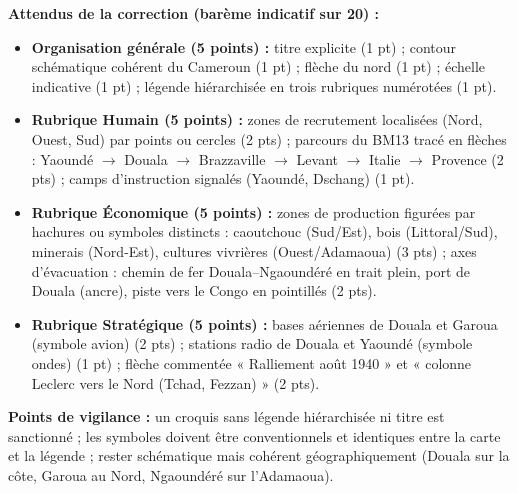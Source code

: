 \documentclass[11pt]{article}
\begin{document}
\begin{corrige}
\textbf{Attendus de la correction (barème indicatif sur 20) :}
\begin{itemize}
\item \textbf{Organisation générale (5 points) :} titre explicite (1 pt) ; contour schématique cohérent du Cameroun (1 pt) ; flèche du nord (1 pt) ; échelle indicative (1 pt) ; légende hiérarchisée en trois rubriques numérotées (1 pt).
\item \textbf{Rubrique Humain (5 points) :} zones de recrutement localisées (Nord, Ouest, Sud) par points ou cercles (2 pts) ; parcours du BM13 tracé en flèches : Yaoundé $\to$ Douala $\to$ Brazzaville $\to$ Levant $\to$ Italie $\to$ Provence (2 pts) ; camps d'instruction signalés (Yaoundé, Dschang) (1 pt).
\item \textbf{Rubrique Économique (5 points) :} zones de production figurées par hachures ou symboles distincts : caoutchouc (Sud/Est), bois (Littoral/Sud), minerais (Nord-Est), cultures vivrières (Ouest/Adamaoua) (3 pts) ; axes d'évacuation : chemin de fer Douala--Ngaoundéré en trait plein, port de Douala (ancre), piste vers le Congo en pointillés (2 pts).
\item \textbf{Rubrique Stratégique (5 points) :} bases aériennes de Douala et Garoua (symbole avion) (2 pts) ; stations radio de Douala et Yaoundé (symbole ondes) (1 pt) ; flèche commentée « Ralliement août 1940 » et « colonne Leclerc vers le Nord (Tchad, Fezzan) » (2 pts).
\end{itemize}
\textbf{Points de vigilance :} un croquis sans légende hiérarchisée ni titre est sanctionné ; les symboles doivent être conventionnels et identiques entre la carte et la légende ; rester schématique mais cohérent géographiquement (Douala sur la côte, Garoua au Nord, Ngaoundéré sur l'Adamaoua).
\end{corrige}
\end{document}
